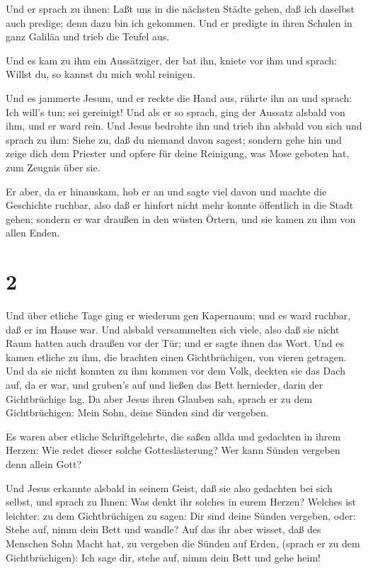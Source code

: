  Und er sprach zu ihnen: Laßt uns in die nächsten Städte
gehen, daß ich daselbst auch predige; denn dazu bin ich gekommen.
 Und er predigte in ihren Schulen in ganz Galiläa und trieb
die Teufel aus.

 Und es kam zu ihm ein Aussätziger, der bat ihn, kniete vor
ihm und sprach: Willst du, so kannst du mich wohl reinigen.

 Und es jammerte Jesum, und er reckte die Hand aus, rührte
ihn an und sprach: Ich will's tun; sei gereinigt!  Und als
er so sprach, ging der Aussatz alsbald von ihm, und er ward rein.
 Und Jesus bedrohte ihn und trieb ihn alsbald von sich
 und sprach zu ihm: Siehe zu, daß du niemand davon sagest;
sondern gehe hin und zeige dich dem Priester und opfere für deine
Reinigung, was Mose geboten hat, zum Zeugnis über sie.

 Er aber, da er hinauskam, hob er an und sagte viel davon
und machte die Geschichte ruchbar, also daß er hinfort nicht mehr konnte
öffentlich in die Stadt gehen; sondern er war draußen in den wüsten
Örtern, und sie kamen zu ihm von allen Enden.

\hypertarget{section-1}{%
\section{2}\label{section-1}}

 Und über etliche Tage ging er wiederum gen Kapernaum; und
es ward ruchbar, daß er im Hause war.  Und alsbald
versammelten sich viele, also daß sie nicht Raum hatten auch draußen vor
der Tür; und er sagte ihnen das Wort.  Und es kamen etliche
zu ihm, die brachten einen Gichtbrüchigen, von vieren getragen.
 Und da sie nicht konnten zu ihm kommen vor dem Volk,
deckten sie das Dach auf, da er war, und gruben's auf und ließen das
Bett hernieder, darin der Gichtbrüchige lag.  Da aber Jesus
ihren Glauben sah, sprach er zu dem Gichtbrüchigen: Mein Sohn, deine
Sünden sind dir vergeben.

 Es waren aber etliche Schriftgelehrte, die saßen allda und
gedachten in ihrem Herzen:  Wie redet dieser solche
Gotteslästerung? Wer kann Sünden vergeben denn allein Gott?

 Und Jesus erkannte alsbald in seinem Geist, daß sie also
gedachten bei sich selbst, und sprach zu Ihnen: Was denkt ihr solches in
eurem Herzen?  Welches ist leichter: zu dem Gichtbrüchigen
zu sagen: Dir sind deine Sünden vergeben, oder: Stehe auf, nimm dein
Bett und wandle?  Auf das ihr aber wisset, daß des Menschen
Sohn Macht hat, zu vergeben die Sünden auf Erden, (sprach er zu dem
Gichtbrüchigen):  Ich sage dir, stehe auf, nimm dein Bett
und gehe heim!

